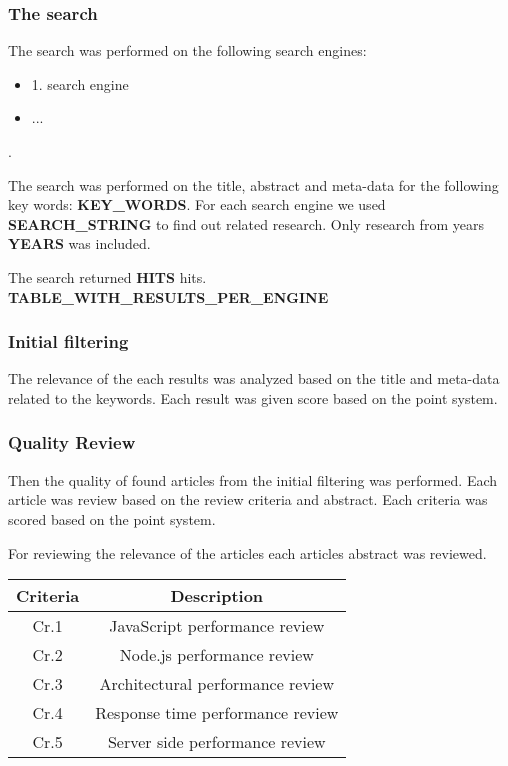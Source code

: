 \subsubsection{The search}
The search was performed on the following search engines: 
\begin{itemize}
    \item 1. search engine
    \item ...
\end{itemize}.

The search was performed on the title, abstract and meta-data for the following key words: \textbf{KEY\_WORDS}.
For each search engine we used \textbf{SEARCH\_STRING} to find out related research.
Only research from years \textbf{YEARS} was included.

The search returned \textbf{HITS} hits.
\textbf{TABLE\_WITH\_RESULTS\_PER\_ENGINE}


\subsubsection{Initial filtering}
The relevance of the each results was analyzed based on the title and meta-data related to the keywords. Each result was given score based on the point system.

\subsubsection{Quality Review}
Then the quality of found articles from the initial filtering was performed.
Each article was review based on the review criteria and abstract.
Each criteria was scored based on the point system.

For reviewing the relevance of the articles each articles abstract was reviewed.

\begin{flushleft}
\begin{tabular}{|c c|} 
 \hline
 Criteria & Description \\ [0.5ex] 
 \hline
  Cr.1 & JavaScript performance review  \\ 
  \hline
  Cr.2 & Node.js performance review  \\ 
  \hline
  Cr.3 & Architectural performance review  \\ 
  \hline
  Cr.4 & Response time performance review  \\ 
  \hline
  Cr.5 & Server side performance review  \\ 
  \hline
\end{tabular}
\end{flushleft}



